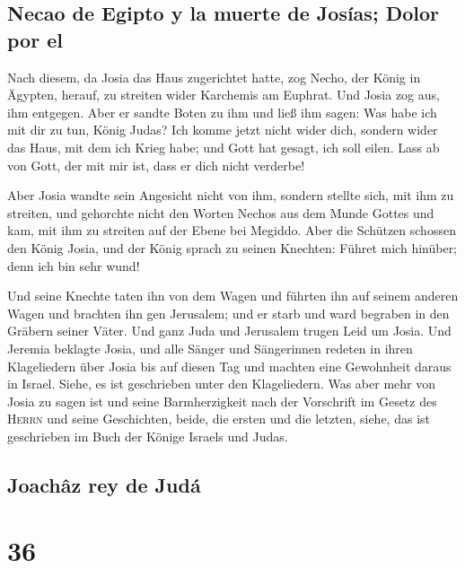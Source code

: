 \hypertarget{necao-de-egipto-y-la-muerte-de-josuxedas-dolor-por-el}{%
\subsection{Necao de Egipto y la muerte de Josías; Dolor por
el}\label{necao-de-egipto-y-la-muerte-de-josuxedas-dolor-por-el}}

 Nach diesem, da Josia das Haus zugerichtet hatte, zog
Necho, der König in Ägypten, herauf, zu streiten wider Karchemis am
Euphrat. Und Josia zog aus, ihm entgegen.  Aber er sandte
Boten zu ihm und ließ ihm sagen: Was habe ich mit dir zu tun, König
Judas? Ich komme jetzt nicht wider dich, sondern wider das Haus, mit dem
ich Krieg habe; und Gott hat gesagt, ich soll eilen. Lass ab von Gott,
der mit mir ist, dass er dich nicht verderbe!

 Aber Josia wandte sein Angesicht nicht von ihm, sondern
stellte sich, mit ihm zu streiten, und gehorchte nicht den Worten Nechos
aus dem Munde Gottes und kam, mit ihm zu streiten auf der Ebene bei
Megiddo.  Aber die Schützen schossen den König Josia, und
der König sprach zu seinen Knechten: Führet mich hinüber; denn ich bin
sehr wund!

 Und seine Knechte taten ihn von dem Wagen und führten
ihn auf seinem anderen Wagen und brachten ihn gen Jerusalem; und er
starb und ward begraben in den Gräbern seiner Väter. Und ganz Juda und
Jerusalem trugen Leid um Josia.  Und Jeremia beklagte
Josia, und alle Sänger und Sängerinnen redeten in ihren Klageliedern
über Josia bis auf diesen Tag und machten eine Gewohnheit daraus in
Israel. Siehe, es ist geschrieben unter den Klageliedern.
 Was aber mehr von Josia zu sagen ist und seine
Barmherzigkeit nach der Vorschrift im Gesetz des \textsc{Herrn}
 und seine Geschichten, beide, die ersten und die
letzten, siehe, das ist geschrieben im Buch der Könige Israels und
Judas.

\hypertarget{joachuxe2z-rey-de-juduxe1}{%
\subsection{Joachâz rey de Judá}\label{joachuxe2z-rey-de-juduxe1}}

\hypertarget{section-35}{%
\section{36}\label{section-35}}

